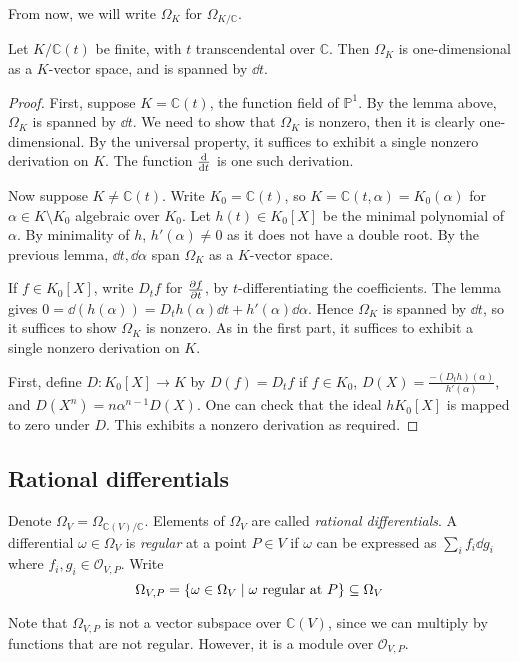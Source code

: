 From now, we will write \( \Omega_K \) for \( \Omega_{K/\mathbb C} \).
\begin{theorem}
    Let \( K/\mathbb C(t) \) be finite, with \( t \) transcendental over \( \mathbb C \).
    Then \( \Omega_K \) is one-dimensional as a \( K \)-vector space, and is spanned by \( \dd{t} \).
\end{theorem}
\begin{proof}
    First, suppose \( K = \mathbb C(t) \), the function field of \( \mathbb P^1 \).
    By the lemma above, \( \Omega_K \) is spanned by \( \dd{t} \).
    We need to show that \( \Omega_K \) is nonzero, then it is clearly one-dimensional.
    By the universal property, it suffices to exhibit a single nonzero derivation on \( K \).
    The function \( \dv{t} \) is one such derivation.

    Now suppose \( K \neq \mathbb C(t) \).
    Write \( K_0 = \mathbb C(t) \), so \( K = \mathbb C(t,\alpha) = K_0(\alpha) \) for \( \alpha \in K \setminus K_0 \) algebraic over \( K_0 \).
    Let \( h(t) \in K_0[X] \) be the minimal polynomial of \( \alpha \).
    By minimality of \( h \), \( h'(\alpha) \neq 0 \) as it does not have a double root.
    By the previous lemma, \( \dd{t}, \dd{\alpha} \) span \( \Omega_K \) as a \( K \)-vector space.

    If \( f \in K_0[X] \), write \( D_t f \) for \( \pdv{f}{t} \), by \( t \)-differentiating the coefficients.
    The lemma gives \( 0 = \dd{(h(\alpha))} = D_t h(\alpha) \dd{t} + h'(\alpha) \dd{\alpha} \).
    Hence \( \Omega_K \) is spanned by \( \dd{t} \), so it suffices to show \( \Omega_K \) is nonzero.
    As in the first part, it suffices to exhibit a single nonzero derivation on \( K \).

    First, define \( D \colon K_0[X] \to K \) by \( D(f) = D_t f \) if \( f \in K_0 \), \( D(X) = \frac{-(D_t h)(\alpha)}{h'(\alpha)} \), and \( D(X^n) = n\alpha^{n-1} D(X) \).
    One can check that the ideal \( hK_0[X] \) is mapped to zero under \( D \).
    This exhibits a nonzero derivation as required.
\end{proof}

\subsection{Rational differentials}
\begin{definition}
    Denote \( \Omega_V = \Omega_{\mathbb C(V)/\mathbb C} \).
    Elements of \( \Omega_V \) are called \emph{rational differentials}.
    A differential \( \omega \in \Omega_V \) is \emph{regular} at a point \( P \in V \) if \( \omega \) can be expressed as \( \sum_i f_i \dd{g_i} \) where \( f_i, g_i \in \mathcal O_{V,P} \).
    Write
    \[ \Omega_{V,P} = \qty{\omega \in \Omega_V \mid \omega \text{ regular at } P} \subseteq \Omega_V \]
\end{definition}
Note that \( \Omega_{V,P} \) is not a vector subspace over \( \mathbb C(V) \), since we can multiply by functions that are not regular.
However, it is a module over \( \mathcal O_{V,P} \).

